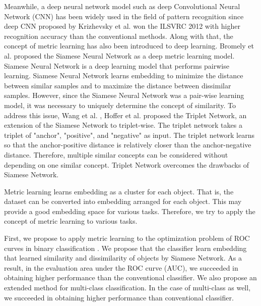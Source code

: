 \documentclass[twocolumn,10pt]{article}
\begin{document}
Meanwhile, a deep neural network model such as deep Convolutional Neural Network (CNN) has been widely used in the field of pattern recognition since deep CNN proposed by Krizhevsky et al. \cite{Krizhevsky2012} won the ILSVRC 2012 with higher recognition accuracy than the conventional methods.
Along with that, the concept of metric learning has also been introduced to deep learning.
Bromely et al. \cite{Bromely1994,Chopra2005,Hadsell2006} proposed the Siamese Neural Network as a deep metric learning model.
Siamese Neural Network is a deep learning model that performs pairwise learning.
Siamese Neural Network learns embedding to minimize the distance between similar samples and to maximize the distance between dissimilar samples.
However, since the Siamese Neural Network was a pair-wise learning model, it was necessary to uniquely determine the concept of similarity.
To address this issue, Wang et al. \cite{Wang2014}, Hoffer et al. \cite{Hoffer2015} proposed the Triplet Network, an extension of the Siamese Network to triplet-wise.
The triplet network takes a triplet of "anchor", "positive", and "negative" as input.
The triplet network learns so that the anchor-positive distance is relatively closer than the anchor-negative distance.
Therefore, multiple similar concepts can be considered without depending on one similar concept.
Triplet Network overcomes the drawbacks of Siamese Network.

Metric learning learns embedding as a cluster for each object.
That is, the dataset can be converted into embedding arranged for each object.
This may provide a good embedding space for various tasks.
Therefore, we try to apply the concept of metric learning to various tasks.

First, we propose to apply metric learning to the optimization problem of ROC curves in binary classification \cite{Oki2019}.
We propose that the classifier learn embedding that learned similarity and dissimilarity of objects by Siamese Network.
As a result, in the evaluation area under the ROC curve (AUC), we succeeded in obtaining higher performance than the conventional classifier.
We also propose an extended method for multi-class classification.
In the case of multi-class as well, we succeeded in obtaining higher performance than conventional classifier.
\end{document}
